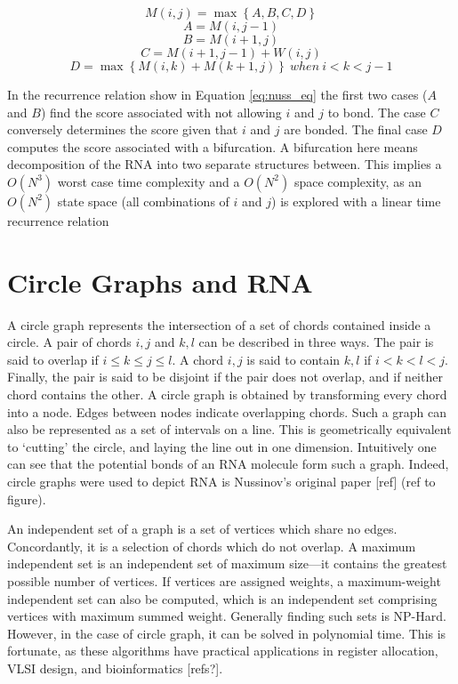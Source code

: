 \documentclass[12pt, a4paper]{article}
\begin{document}
\begin{equation} \label{eq:nuss_eq}
	M(i, j) = \max \left\lbrace A, B, C, D \right\rbrace 
\end{equation}
\[
A = M(i, j-1)
\]
\[
B = M(i+1, j)
\]
\[
C = M(i+1, j-1) + W(i, j)
\]
\[
D = \max \left\lbrace M(i, k) + M(k+1, j) \right\rbrace \: when \: i < k < j - 1
\]


In the recurrence relation show in Equation \ref{eq:nuss_eq} the first two cases ($A$ and $B$) find the score associated with not allowing $i$ and $j$ to bond. The case $C$ conversely determines the score given that $i$ and $j$ are bonded. The final case $D$ computes the score associated with a bifurcation. A bifurcation here means decomposition of the RNA into two separate structures between. This implies a $O(N^3)$
worst case time complexity and a $O(N^2)$ space complexity, as an $O(N^2)$ state space (all combinations of $i$ and $j$) is explored
with a linear time recurrence relation



\section*{Circle Graphs and RNA}
A circle graph represents the intersection of a set of chords contained inside a circle.
A pair of chords $i, j$ and $k, l$ can be described in three ways. The pair is said to overlap if $i \leq k \leq j \leq l$. A chord $i, j$ is said to contain $k, l$ if $i < k < l < j$. Finally, the pair is said to be disjoint if the pair does not overlap, and if neither chord contains the other. A circle graph is obtained by transforming every chord into a node. Edges between nodes indicate overlapping chords. Such a graph can also be represented as a set of intervals on a line. This is geometrically equivalent to ‘cutting’ the circle, and laying the line out in one dimension. Intuitively one can see that the potential bonds of an RNA molecule form such a graph. Indeed, circle graphs were used to depict RNA is Nussinov's original paper [ref] (ref to figure).

An independent set of a graph is a set of vertices which share no edges. Concordantly, it is a selection of chords which do not overlap. A maximum independent set is an independent set of maximum size---it contains the greatest possible number of vertices. If vertices are assigned weights, a maximum-weight independent set can also be computed, which is an independent set comprising vertices with maximum summed weight. Generally finding such sets is NP-Hard. However, in the case of circle graph, it can be solved in polynomial time. This is fortunate, as these algorithms have practical applications in register allocation, VLSI design, and bioinformatics [refs?].
\end{document}
